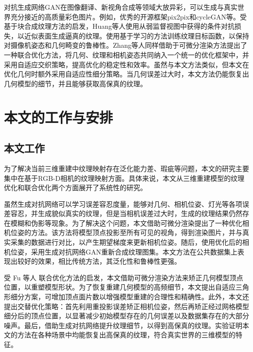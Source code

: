 \vspace*{2mm}对抗生成网络GAN在图像翻译、新视角合成等领域大放异彩，可以生成与真实世界充分接近的高质量彩色图片。例如，优秀的开源框架pix2pix和cycleGAN等。受基于块合成纹理方法的启发，Huang等人使用从弱监督视图中获得的条件对抗损失，以近似表面生成逼真的纹理。使用基于学习的方法训练纹理目标函数，以保持对摄像机姿态和几何畸变的鲁棒性。Zhang等人同样借助于可微分渲染方法提出了一种联合优化方法，将几何、纹理和相机姿态共同纳入一个统一的优化框架中，并采用自适应交织策略，提高优化的稳定性和效率。虽然与本文方法类似，但本文在优化几何时额外采用自适应性细分策略。当几何误差过大时，本文方法仍能恢复出几何模型的细节，并且能够获取高保真的纹理。
\section{本文的工作与安排}

\subsection{本文工作}
为了解决当前三维重建中纹理映射存在泛化能力差、瑕疵等问题，本文的研究主要集中在基于RGB-D相机的纹理映射方面。具体来说，本文从三维重建模型的纹理优化和联合优化两个方面展开了系统性的研究。\par

虽然生成对抗网络可以学习误差容忍度量，能够对几何、相机位姿、灯光等各项误差容忍，并生成貌似真实的纹理，但是当相机误差过大时，生成的纹理结果仍然存在模糊和伪影等现象。为了解决这个问题，本文借助可微分渲染提出了一种优化相机位姿的方法。该方法将模型顶点投影至所有可见的视角，得到渲染图片，并与真实采集的数据进行对比，以产生期望梯度来更新相机位姿。随后，使用优化后的相机位姿，采用生成对抗网络GAN重新合成纹理图集。本文方法在公共数据集上表现出较好的效果，相比传统方法，其泛化性和鲁棒性更强。\par

受 Fu 等人 联合优化方法的启发，本文借助可微分渲染方法来矫正几何模型顶点位置，以重塑模型形状。为了恢复重建几何模型的高频细节，本文提出自适应三角形细分方案，可增加顶点面片数以增强模型重建的合理性和精确性。此外，本文还提出交替优化策略：首先利用重投影误差矫正相机位姿，然后再矫正经过网格模型细分后的顶点位置，以显著减少初始模型存在的几何误差以及数据集存在的大部分噪声。最后，借助生成对抗网络提升纹理细节，以得到高保真的纹理。实验证明本文的方法在各种场景中均能恢复出高保真的纹理，符合真实世界的三维模型的特征。

